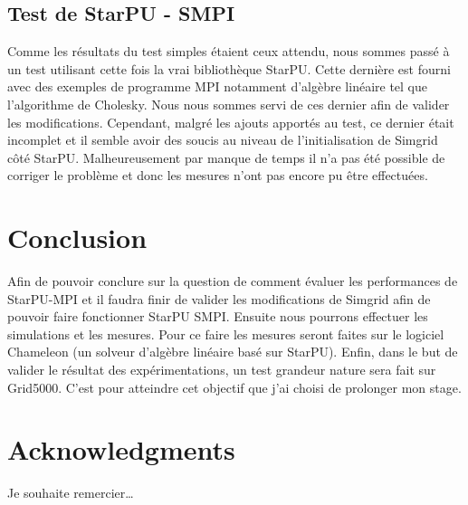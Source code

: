 \documentclass[smallextended]{svjour3}
\begin{document}
\subsection{Test de StarPU - SMPI}
\label{sec-6-2}
Comme les résultats du test simples étaient ceux attendu, nous
sommes passé à un test utilisant cette fois la vrai bibliothèque
StarPU. Cette dernière est fourni avec des exemples de programme MPI
notamment d'algèbre linéaire tel que l'algorithme de Cholesky. Nous
nous sommes servi de ces dernier afin de valider les
modifications. Cependant, malgré les ajouts apportés au test, ce
dernier était incomplet et il semble avoir des soucis au niveau de
l'initialisation de Simgrid côté StarPU.
Malheureusement par manque de temps il n'a pas été possible de
corriger le problème et donc les mesures n'ont pas encore pu être
effectuées.


\section{Conclusion}
\label{sec-7}

Afin de pouvoir conclure sur la question de comment évaluer les
performances de StarPU-MPI et il faudra finir de valider les
modifications de Simgrid afin de pouvoir faire fonctionner StarPU
SMPI. Ensuite nous pourrons effectuer les simulations et les
mesures. Pour ce faire les mesures seront faites sur le logiciel
Chameleon (un solveur d'algèbre linéaire basé sur StarPU).
Enfin, dans le but de valider le résultat des expérimentations, un test
grandeur nature sera fait sur Grid5000.
C'est pour atteindre cet objectif que j'ai choisi de prolonger mon stage.


\section*{Acknowledgments}
Je souhaite remercier\ldots{}

\def\raggedright{}


\end{document}
